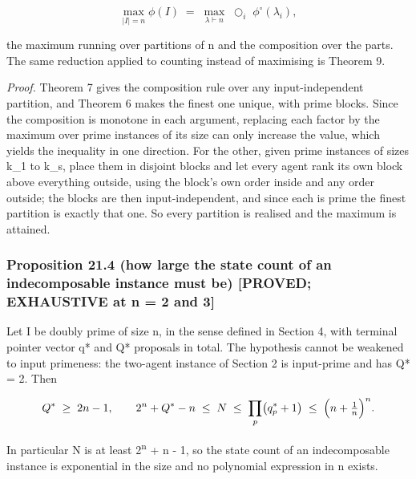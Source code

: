 \documentclass[
  11pt,
]{article}
\begin{document}
\[
\max_{|I| = n} \phi(I) \;=\; \max_{\lambda \vdash n} \;\bigcirc_{i} \; \phi^{\circ}(\lambda_i),
\]

the maximum running over partitions of n and the composition over the
parts. The same reduction applied to counting instead of maximising is
Theorem 9.

\emph{Proof.} Theorem 7 gives the composition rule over any
input-independent partition, and Theorem 6 makes the finest one unique,
with prime blocks. Since the composition is monotone in each argument,
replacing each factor by the maximum over prime instances of its size
can only increase the value, which yields the inequality in one
direction. For the other, given prime instances of sizes k\_1 to k\_s,
place them in disjoint blocks and let every agent rank its own block
above everything outside, using the block's own order inside and any
order outside; the blocks are then input-independent, and since each is
prime the finest partition is exactly that one. So every partition is
realised and the maximum is attained.

\hypertarget{proposition-21.4-how-large-the-state-count-of-an-indecomposable-instance-must-be-proved-exhaustive-at-n-2-and-3}{%
\subsubsection{Proposition 21.4 (how large the state count of an
indecomposable instance must be) {[}PROVED; EXHAUSTIVE at n = 2 and
3{]}}\label{proposition-21.4-how-large-the-state-count-of-an-indecomposable-instance-must-be-proved-exhaustive-at-n-2-and-3}}

Let I be doubly prime of size n, in the sense defined in Section 4, with
terminal pointer vector q* and Q* proposals in total. The hypothesis
cannot be weakened to input primeness: the two-agent instance of Section
2 is input-prime and has Q* = 2. Then

\[
Q^{*} \;\ge\; 2n-1, \qquad 2^{n} + Q^{*} - n \;\le\; N \;\le\; \prod_{p}\bigl(q^{*}_{p}+1\bigr) \;\le\; \Bigl(n+\tfrac{1}{n}\Bigr)^{n}.
\]

In particular N is at least 2\textsuperscript{n} + n - 1, so the state
count of an indecomposable instance is exponential in the size and no
polynomial expression in n exists.
\end{document}
